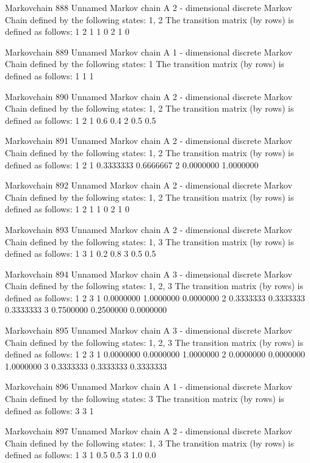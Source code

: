 \documentclass[
  nojss]{jss}
\begin{document}
\begin{CodeChunk}
\begin{CodeOutput}
Markovchain  888 
Unnamed Markov chain 
 A  2 - dimensional discrete Markov Chain defined by the following states: 
 1, 2 
 The transition matrix  (by rows)  is defined as follows: 
  1 2
1 1 0
2 1 0

Markovchain  889 
Unnamed Markov chain 
 A  1 - dimensional discrete Markov Chain defined by the following states: 
 1 
 The transition matrix  (by rows)  is defined as follows: 
  1
1 1

Markovchain  890 
Unnamed Markov chain 
 A  2 - dimensional discrete Markov Chain defined by the following states: 
 1, 2 
 The transition matrix  (by rows)  is defined as follows: 
    1   2
1 0.6 0.4
2 0.5 0.5

Markovchain  891 
Unnamed Markov chain 
 A  2 - dimensional discrete Markov Chain defined by the following states: 
 1, 2 
 The transition matrix  (by rows)  is defined as follows: 
          1         2
1 0.3333333 0.6666667
2 0.0000000 1.0000000

Markovchain  892 
Unnamed Markov chain 
 A  2 - dimensional discrete Markov Chain defined by the following states: 
 1, 2 
 The transition matrix  (by rows)  is defined as follows: 
  1 2
1 1 0
2 1 0

Markovchain  893 
Unnamed Markov chain 
 A  2 - dimensional discrete Markov Chain defined by the following states: 
 1, 3 
 The transition matrix  (by rows)  is defined as follows: 
    1   3
1 0.2 0.8
3 0.5 0.5

Markovchain  894 
Unnamed Markov chain 
 A  3 - dimensional discrete Markov Chain defined by the following states: 
 1, 2, 3 
 The transition matrix  (by rows)  is defined as follows: 
          1         2         3
1 0.0000000 1.0000000 0.0000000
2 0.3333333 0.3333333 0.3333333
3 0.7500000 0.2500000 0.0000000

Markovchain  895 
Unnamed Markov chain 
 A  3 - dimensional discrete Markov Chain defined by the following states: 
 1, 2, 3 
 The transition matrix  (by rows)  is defined as follows: 
          1         2         3
1 0.0000000 0.0000000 1.0000000
2 0.0000000 0.0000000 1.0000000
3 0.3333333 0.3333333 0.3333333

Markovchain  896 
Unnamed Markov chain 
 A  1 - dimensional discrete Markov Chain defined by the following states: 
 3 
 The transition matrix  (by rows)  is defined as follows: 
  3
3 1

Markovchain  897 
Unnamed Markov chain 
 A  2 - dimensional discrete Markov Chain defined by the following states: 
 1, 3 
 The transition matrix  (by rows)  is defined as follows: 
    1   3
1 0.5 0.5
3 1.0 0.0


\end{CodeOutput}
\end{CodeChunk}
\end{document}

